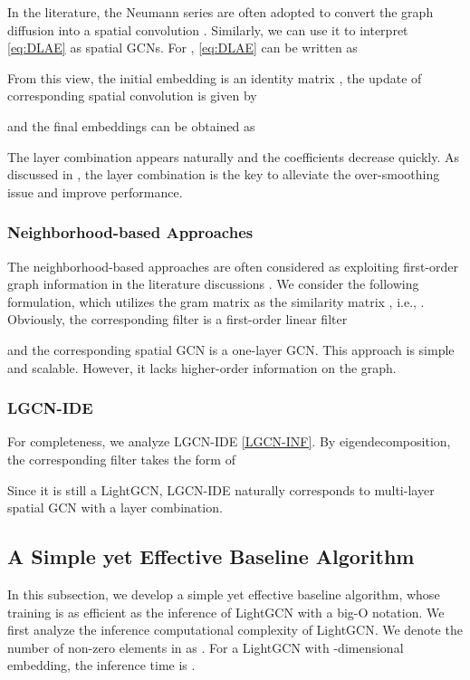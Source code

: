 \documentclass[sigconf]{acmart}
\begin{document}
In the literature, the Neumann series are often adopted to convert the graph diffusion into a spatial convolution \cite{klicpera2018predict,xhonneux2020continuous}. Similarly, we can use it to interpret \eqref{eq:DLAE} as spatial GCNs. For , \eqref{eq:DLAE} can be written as 

From this view, the initial embedding is an identity matrix , the update of corresponding spatial convolution is given by

and the final embeddings can be obtained as

The layer combination appears naturally and the coefficients decrease quickly. As discussed in \cite{he2020lightgcn}, the layer combination is the key to alleviate the over-smoothing issue and improve performance.

 



\subsubsection{Neighborhood-based Approaches} The neighborhood-based approaches are often considered as exploiting first-order graph information in the literature discussions \cite{he2020lightgcn}. We consider the following formulation, which utilizes the gram matrix as the similarity matrix \cite{aiolli2013efficient}, i.e., . Obviously, the corresponding filter is a first-order linear filter

and the corresponding spatial GCN is a one-layer GCN. This approach is simple and scalable. However, it lacks higher-order information on the graph. 

\subsubsection{LGCN-IDE} For completeness, we analyze LGCN-IDE \eqref{LGCN-INF}. By eigendecomposition, the corresponding filter takes the form of 

Since it is still a LightGCN, LGCN-IDE naturally corresponds to multi-layer spatial GCN with a layer combination. 



\subsection{A Simple yet Effective Baseline Algorithm}
In this subsection, we develop a simple yet effective baseline algorithm, whose training is as efficient as the inference of LightGCN with a big-O notation. We first analyze the inference computational complexity of LightGCN. We denote the number of non-zero elements in  as . For a LightGCN with -dimensional embedding, the inference time is .
\end{document}
